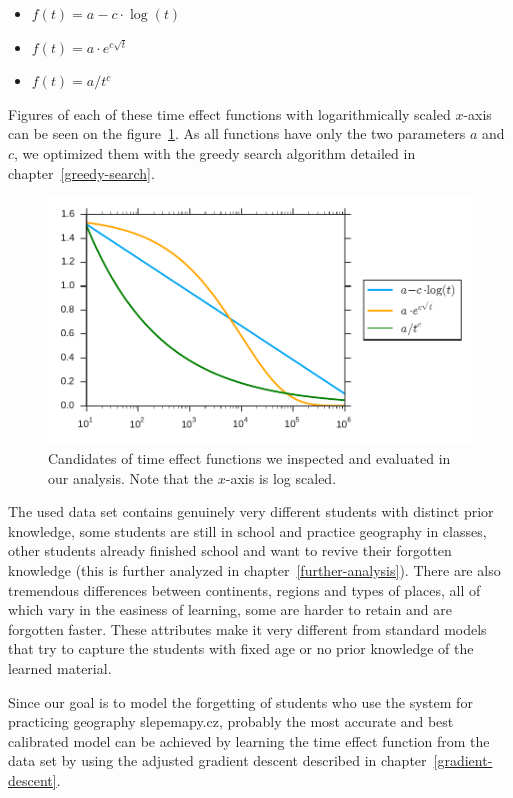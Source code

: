 \begin{itemize}
  \item $f(t) = a - c \cdot \log(t)$
  \item $f(t) = a \cdot e^{c \sqrt{t}}$
  \item $f(t) = a / t^c$
\end{itemize}

Figures of each of these time effect functions with logarithmically scaled $x$-axis can be seen on the figure~\ref{fig-time-effect-functions}. As all functions have only the two parameters $a$ and $c$, we optimized them with the greedy search algorithm detailed in chapter~\ref{greedy-search}.

\begin{figure}[htbp]
  \centering
  \includegraphics[width=\textwidth]{img/time-effect-functions}
  \caption{Candidates of time effect functions we inspected and evaluated in our analysis. Note that the $x$-axis is log scaled.}
  \label{fig-time-effect-functions}
\end{figure}

The used data set contains genuinely very different students with distinct prior knowledge, some students are still in school and practice geography in classes, other students already finished school and want to revive their forgotten knowledge (this is further analyzed in chapter~\ref{further-analysis}). There are also tremendous differences between continents, regions and types of places, all of which vary in the easiness of learning, some are harder to retain and are forgotten faster. These attributes make it very different from standard models that try to capture the students with fixed age or no prior knowledge of the learned material.

Since our goal is to model the forgetting of students who use the system for practicing geography slepemapy.cz, probably the most accurate and best calibrated model can be achieved by learning the time effect function from the data set by using the adjusted gradient descent described in chapter~\ref{gradient-descent}.

